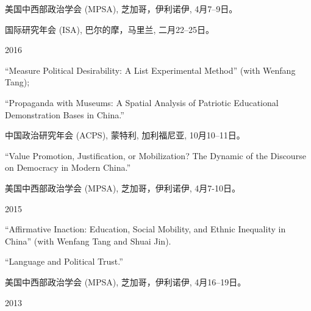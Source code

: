 \documentclass[10.5pt,]{article}
\providecommand{\tightlist}{%
	\setlength{\itemsep}{0pt}\setlength{\parskip}{0pt}}
\renewenvironment{itemize}{
	\begin{list}{}{
			\setlength{\leftmargin}{1.5em}
		}
	}{
	\end{list}
}
\begin{document}
\begin{itemize}
\begin{itemize}
    \begin{itemize}
    \tightlist
    \item
      \footnotesize 美国中西部政治学会 (MPSA), 芝加哥，伊利诺伊,
      4月7--9日。
    \item
      \footnotesize 国际研究年会 (ISA), 巴尔的摩，马里兰, 二月22--25日。
    \end{itemize}
  \end{itemize}
\item
  2016

  \begin{itemize}
  \tightlist
  \item
    ``Measure Political Desirability: A List Experimental Method'' (with
    Wenfang Tang);
  \item
    ``Propaganda with Museums: A Spatial Analysis of Patriotic
    Educational Demonstration Bases in China.''

    \begin{itemize}
    \tightlist
    \item
      \footnotesize 中国政治研究年会 (ACPS), 蒙特利, 加利福尼亚,
      10月10--11日。
    \end{itemize}
  \item
    ``Value Promotion, Justification, or Mobilization? The Dynamic of
    the Discourse on Democracy in Modern China.''

    \begin{itemize}
    \tightlist
    \item
      \footnotesize 美国中西部政治学会 (MPSA), 芝加哥，伊利诺伊,
      4月7-10日。
    \end{itemize}
  \end{itemize}
\item
  2015

  \begin{itemize}
  \tightlist
  \item
    ``Affirmative Inaction: Education, Social Mobility, and Ethnic
    Inequality in China'' (with Wenfang Tang and Shuai Jin).
  \item
    ``Language and Political Trust.''

    \begin{itemize}
    \tightlist
    \item
      \footnotesize 美国中西部政治学会 (MPSA), 芝加哥，伊利诺伊,
      4月16--19日。
    \end{itemize}
  \end{itemize}
\item
  2013


\end{itemize}
\end{document}
